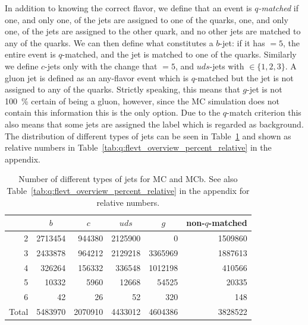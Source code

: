In addition to knowing the correct flavor, we define that an event is \emph{$q$-matched} if one, and only one, of the jets are assigned to one of the quarks, one, and only one, of the jets are assigned to the other quark, and no other jets are matched to any of the quarks. We can then define what constitutes a $b$-jet: if it has  $= 5$, the entire event is $q$-matched, and the jet is matched to one of the quarks. Similarly we define $c$-jets only with the change that  $= 5$, and $uds$-jets with  $\in \{1, 2, 3\}$. A gluon jet is defined as an any-flavor event which is $q$-matched but the jet is not assigned to any of the quarks. Strictly speaking, this means that $g$-jet is not \SI{100}{\percent} certain of being a gluon, however, since the MC simulation does not contain this information this is the only option. Due to the $q$-match criterion this also means that some jets are assigned the label  which is regarded as background. The distribution of different types of jets can be seen in Table~\ref{tab:q:flevt_overview} and shown as relative numbers in Table~\ref{tab:q:flevt_overview_percent_relative} in the appendix.

\begin{table}[h!]
  \centering
  \begin{tabular}{@{}rrrrrr@{}}
    {}    & \multicolumn{1}{c}{$b$} & \multicolumn{1}{c}{$c$} & \multicolumn{1}{c}{$uds$} & \multicolumn{1}{c}{$g$} & non-$q$-matched    \\ 
    \midrule
    2     & \num{2713454} &  \num{944380} & \num{2125900} &       \num{0} & \num{1509860} \\
    3     & \num{2433878} &  \num{964212} & \num{2129218} & \num{3365969} & \num{1887613} \\
    4     &  \num{326264} &  \num{156332} &  \num{336548} & \num{1012198} &  \num{410566} \\
    5     &   \num{10332} &    \num{5960} &   \num{12668} &   \num{54525} &   \num{20335} \\
    6     &      \num{42} &      \num{26} &      \num{52} &     \num{320} &     \num{148} \\
    \midrule
    Total & \num{5483970} & \num{2070910} & \num{4433012} & \num{4604386} & \num{3828522} \\
  \end{tabular}
  \caption{Number of different types of jets for MC and MCb. See also Table~\ref{tab:q:flevt_overview_percent_relative} in the appendix for relative numbers.}
  \label{tab:q:flevt_overview}
\end{table}

